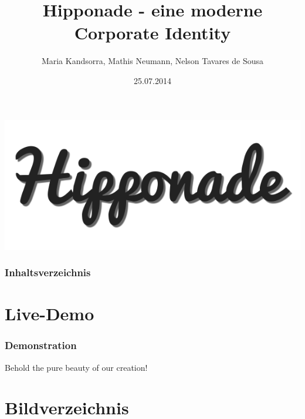 \documentclass{beamer}
\begin{document}
\title{Hipponade - eine moderne Corporate Identity}  
\author{Maria Kandsorra, Mathis Neumann, Nelson Tavares de Sousa}
\date{25.07.2014} 

\begin{frame}
	\begin{center}
		\includegraphics[scale=0.5]{bilder/logo.png} 
	\end{center}
	\titlepage
\end{frame} 

\begin{frame}
	\frametitle{Inhaltsverzeichnis}
	\tableofcontents
\end{frame} 









\section{Live-Demo} 
\begin{frame}
	\frametitle{Demonstration} 
	Behold the pure beauty of our creation!
\end{frame}

\section{Bildverzeichnis}
\begin{frame}
	\listoffigures
\end{frame}
\end{document}
